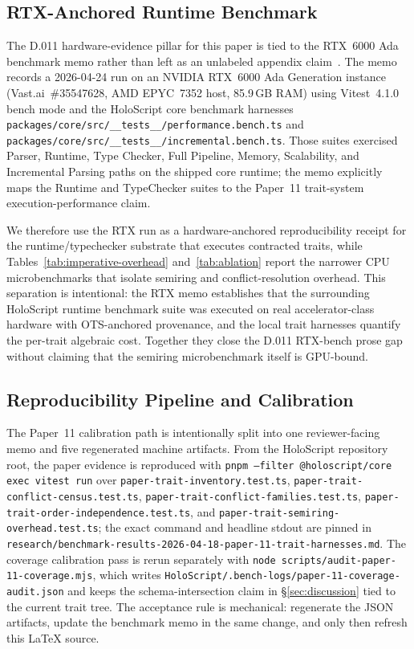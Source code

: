\documentclass[sigconf,nonacm]{acmart}
\providecommand{\measuredFrom}[1]{}
\begin{document}
\subsection{RTX-Anchored Runtime Benchmark}
\label{sec:rtx-benchmark}

The D.011 hardware-evidence pillar for this paper is tied to the
RTX~6000 Ada benchmark memo rather than left as an unlabeled appendix
claim~\cite{benchmark-rtx6000ada-2026}.  The memo records a 2026-04-24
run on an NVIDIA RTX~6000 Ada Generation instance (Vast.ai~\#35547628,
AMD EPYC~7352 host, 85.9\,GB RAM) using Vitest~4.1.0 bench mode and the
HoloScript core benchmark harnesses
\texttt{packages/core/src/\_\_tests\_\_/performance.bench.ts} and
\texttt{packages/core/src/\_\_tests\_\_/incremental.bench.ts}.  Those
suites exercised Parser, Runtime, Type Checker, Full Pipeline, Memory,
Scalability, and Incremental Parsing paths on the shipped core runtime;
the memo explicitly maps the Runtime and TypeChecker suites to the
Paper~11 trait-system execution-performance claim.

We therefore use the RTX run as a hardware-anchored reproducibility
receipt for the runtime/typechecker substrate that executes contracted
traits, while Tables~\ref{tab:imperative-overhead} and~\ref{tab:ablation}
report the narrower CPU microbenchmarks that isolate semiring and
conflict-resolution overhead.  This separation is intentional: the RTX
memo establishes that the surrounding HoloScript runtime benchmark suite
was executed on real accelerator-class hardware with OTS-anchored
provenance, and the local trait harnesses quantify the per-trait algebraic
cost.  Together they close the D.011 RTX-bench prose gap without claiming
that the semiring microbenchmark itself is GPU-bound.
\measuredFrom{research/benchmark-results-2026-04-24-core-rtx6000ada.md}%
\measuredFrom{research/benchmark-results-2026-04-24-core-rtx6000ada.md.ots}%

\subsection{Reproducibility Pipeline and Calibration}
\label{sec:paper11-repro-pipeline}

The Paper~11 calibration path is intentionally split into one
reviewer-facing memo and five regenerated machine artifacts. From the
HoloScript repository root, the paper evidence is reproduced with
\texttt{pnpm --filter @holoscript/core exec vitest run} over
\texttt{paper-trait-inventory.test.ts},
\texttt{paper-trait-conflict-census.test.ts},
\texttt{paper-trait-conflict-families.test.ts},
\texttt{paper-trait-order-independence.test.ts}, and
\texttt{paper-trait-semiring-overhead.test.ts}; the exact command and
headline stdout are pinned in
\texttt{research/benchmark-results-2026-04-18-paper-11-trait-harnesses.md}.
The coverage calibration pass is rerun separately with
\texttt{node scripts/audit-paper-11-coverage.mjs}, which writes
\texttt{HoloScript/.bench-logs/paper-11-coverage-audit.json} and keeps
the schema-intersection claim in \S\ref{sec:discussion} tied to the
current trait tree. The acceptance rule is mechanical: regenerate the JSON
artifacts, update the benchmark memo in the same change, and only then
refresh this \LaTeX{} source.
\end{document}
